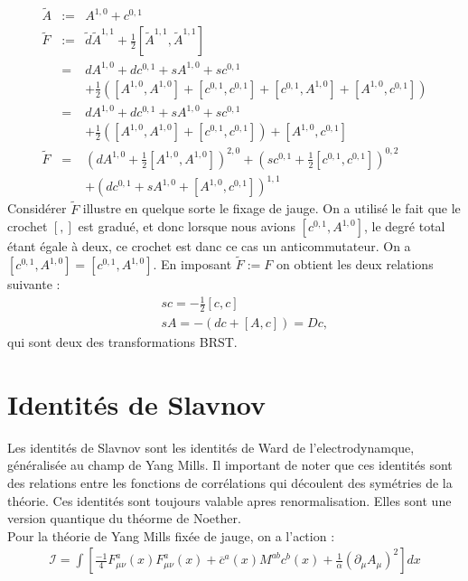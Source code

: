 \documentclass[a4paper,11pt]{article} %
\theoremstyle{plain}
\theoremstyle{definition}
\theoremstyle{remark}
\numberwithin{equation}{section}
\numberwithin{equation}{subsection}
\numberwithin{figure}{section}
\begin{document}
\begin{eqnarray*}
 \tilde{A}  &:=& A^{1,0} + c^{0,1}\\
 \tilde{F}  &:=& \tilde{d} \tilde{A}^{1,1} + \frac{1}{2} \left[ \tilde{A}^{1,1} , \tilde{A}^{1,1} \right]\\
            &=& dA^{1,0} + dc^{0,1} + sA^{1,0} + sc^{0,1} \nonumber \\ &&  
+ \frac{1}{2} \left( [A^{1,0},A^{1,0}] + [c^{0,1},c^{0,1}] + [c^{0,1},A^{1,0}]  + [A^{1,0},c^{0,1}] \right) \\ 
            &=& dA^{1,0} + dc^{0,1} + sA^{1,0} + sc^{0,1} \nonumber \\ &&  
+ \frac{1}{2} \left( [A^{1,0},A^{1,0}] + [c^{0,1},c^{0,1}]  \right) +  [A^{1,0},c^{0,1}] \\ 
 \tilde{F}  &=& \left( dA^{1,0} + \frac{1}{2}[A^{1,0},A^{1,0}] \right)^{2,0}  
+ \left( sc^{0,1} + \frac{1}{2} [c^{0,1},c^{0,1}] \right)^{0,2}   \nonumber \\ 
&& + \left( dc^{0,1} + sA^{1,0} + [A^{1,0},c^{0,1}] \right)^{1,1}
\end{eqnarray*}
Considérer $\tilde{F}$ illustre en quelque sorte le fixage de jauge. On a utilisé le fait que le crochet $[,]$ est gradué, et donc lorsque 
nous avions $[c^{0,1},A^{1,0}]$, le degré total étant égale à deux, ce crochet est danc ce cas un anticommutateur. 
On a  $[c^{0,1},A^{1,0}] =  [c^{0,1},A^{1,0}]$. En imposant   $\tilde{F} := F$ on obtient les deux relations suivante :
\begin{eqnarray*}
  && sc = - \frac{1}{2} \left[ c , c \right] \\
  && sA = - \left( dc + [A,c] \right) = Dc ,
\end{eqnarray*}
qui sont deux des transformations BRST.

\section{Identités de Slavnov}

\noindent
Les identités de Slavnov sont les identités de Ward de l'electrodynamque, généralisée au champ de Yang Mills. 
Il important de noter que ces identités sont des relations entre les fonctions de corrélations qui découlent des symétries de la théorie. 
Ces identités sont toujours valable apres renormalisation. Elles sont une version quantique du théorme de Noether.\\

\noindent
Pour la théorie de Yang Mills fixée de jauge, on a l'action :
\begin{eqnarray*}
 \mathcal{I} =  \int \left[ 
\frac{-1}{4} F^{a}_{\mu\nu}(x)F^{a}_{\mu \nu}(x) + \overline{c}^{a}(x)M^{ab}c^{b}(x) + \frac{1}{\alpha} (\partial_{\mu}A_{\mu})^2  
\right] dx 
\end{eqnarray*}
\end{document}
